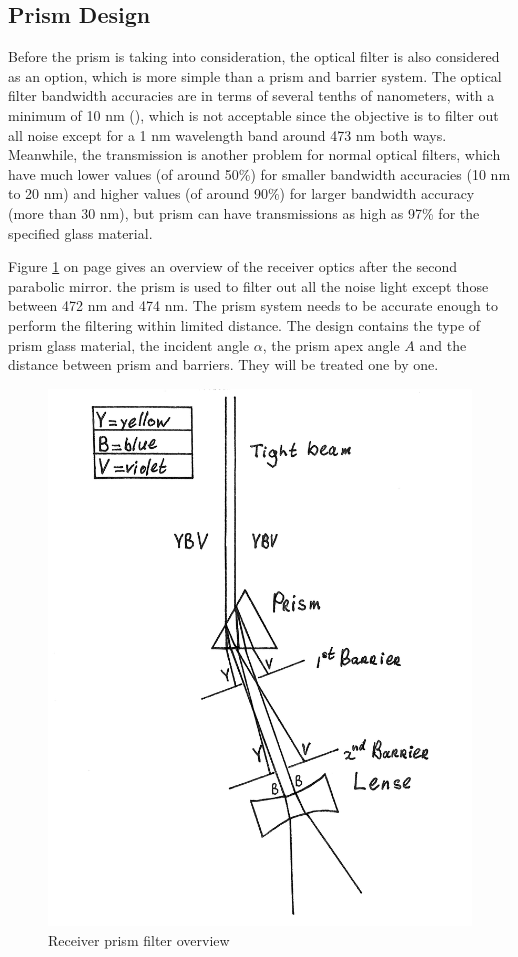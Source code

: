\subsection{Prism Design}
\label{prism}
Before the prism is taking into consideration, the optical filter is also considered as an option, which is more simple than a prism and barrier system. The optical filter bandwidth accuracies are in terms of several tenths of nanometers, with a minimum of 10 nm (\cite{optical_filter}), which is not acceptable since the objective is to filter out all noise except for a 1 nm wavelength band around 473 nm both ways. Meanwhile, the transmission is another problem for normal optical filters, which have much lower values (of around 50\%) for smaller bandwidth accuracies (10 nm to 20 nm) and higher values (of around 90\%) for larger bandwidth accuracy (more than 30 nm), but prism can have transmissions as high as 97\% for the specified glass material.

Figure \ref{fig:prism} on page \pageref{fig:prism} gives an overview of the receiver optics after the second parabolic mirror. the prism is used to filter out all the noise light except those between 472 nm and 474 nm. The prism system needs to be accurate enough to perform the filtering within limited distance. The design contains the type of prism glass material, the incident angle $\alpha$, the prism apex angle $A$ and the distance between prism and barriers. They will be treated one by one.

\begin{figure}[ht!]
\centering
\includegraphics[scale = 0.6]{chapters/img/Prism.png}
\caption{Receiver prism filter overview}
\label{fig:prism}
\end{figure} 


